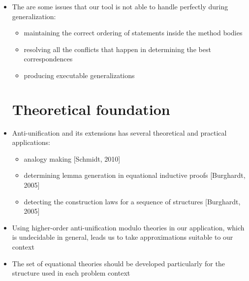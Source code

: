 \begin{itemize} [leftmargin=.01in]
\item The are some issues that our tool is not able to handle perfectly during generalization:
\begin{itemize} [leftmargin=.3in]
\item maintaining the correct ordering of statements inside the method bodies
\item resolving all the conflicts that happen in determining the best correspondences
\item producing executable generalizations
\end{itemize}
\section{Theoretical foundation}  \label{theory}
\item Anti-unification and its extensions has several theoretical and practical applications:
\begin{itemize} [leftmargin=.3in]
\item analogy making [Schmidt, 2010]
\item determining lemma generation in equational inductive proofs [Burghardt, 2005]
\item detecting the construction laws for a sequence of structures [Burghardt, 2005]
\end{itemize}
\item Using higher-order anti-unification modulo theories in our application, which is undecidable in general, leads us to take approximations suitable to our context
\item The set of equational theories should be developed particularly for the structure used in each problem context
\end{itemize}